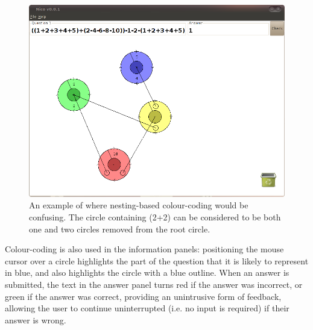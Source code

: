 \documentclass[12pt,twoside,notitlepage,xetex]{report}
\begin{document}
\begin{center}
\begin{figure}[H]
\begin{center}
\includegraphics[width=\textwidth-2cm]{figs/nico_screen_02.png}
\end{center}
\caption{An example of where nesting-based colour-coding would be confusing.  The circle containing (2+2) can be considered to be both one and two circles removed from the root circle.}
\end{figure}
\end{center}

Colour-coding is also used in the information panels: positioning the mouse cursor over a circle highlights the part of
the question that it is likely to represent in blue, and also highlights the
circle with a blue outline.  When an answer is submitted, the text in the
answer panel turns red if the answer was incorrect, or green if the answer was
correct, providing an unintrusive form of feedback, allowing the user to
continue uninterrupted (i.e. no input is required) if their answer is wrong.
\end{document}
